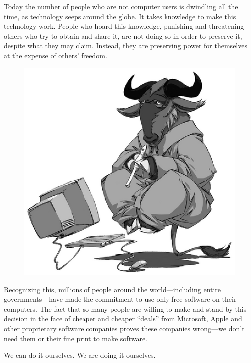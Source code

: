 \documentclass[twoside,12pt]{article}
\begin{document}
Today the number of people who are not computer users is dwindling all the
time, as technology seeps around the globe. It takes knowledge to make this
technology work. People who hoard this knowledge, punishing and threatening
others who try to obtain and share it, are not doing so in order to preserve
it, despite what they may claim. Instead, they are preserving power for
themselves at the expense of others' freedom.

\begin{figure}
  \vspace{-0.25in}
  \begin{center}
    \includegraphics[scale=0.45]{gnu-think-smaller.eps}
  \end{center}
\end{figure}

Recognizing this, millions of people around the world---including entire
governments---have made the commitment to use only free software on their
computers. The fact that so many people are willing to make and stand by this
decision in the face of cheaper and cheaper ``deals'' from Microsoft, Apple and
other proprietary software companies proves these companies wrong---we don't
need them or their fine print to make software.

We can do it ourselves. We are doing it ourselves.
\end{document}
